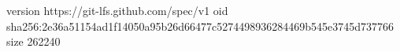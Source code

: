 version https://git-lfs.github.com/spec/v1
oid sha256:2e36a51154ad1f14050a95b26d66477c5274498936284469b545e3745d737766
size 262240
